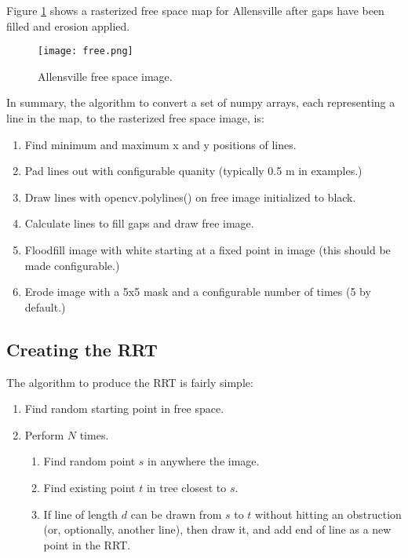 \documentclass[10pt,twocolumn,letterpaper]{article}
\begin{document}
Figure \ref{fig:free} shows a rasterized free space map for Allensville after
gaps have been filled and erosion applied.

\begin{centering}
\begin{figure}[ht]
\caption{Allensville free space image.}
\centering
\texttt{[image: free.png]}
\label{fig:free}
\end{figure}
\end{centering}

In summary, the algorithm to convert a set of numpy arrays, each
representing a line in the map, to the rasterized free space image,
is:

\begin{enumerate}
\item Find minimum and maximum x and y positions of lines.
\item Pad lines out with configurable quanity (typically 0.5 m in examples.)
\item Draw lines with opencv.polylines() on free image initialized to black.
\item Calculate lines to fill gaps and draw free image.
\item Floodfill image with white starting at a fixed point in image (this should be made configurable.)
\item Erode image with a 5x5 mask and a configurable number of times
  (5 by default.)
\end{enumerate}

\subsection{Creating the RRT}

The algorithm to produce the RRT is fairly simple:

\begin{enumerate}
\item Find random starting point in free space.
\item Perform $N$ times.
\begin{enumerate}
\item Find random point $s$ in anywhere the image.
\item Find existing point $t$ in tree closest to $s$.
\item If line of length $d$ can be drawn from $s$ to $t$ without
  hitting an obstruction (or, optionally, another line), then draw it,
  and add end of line as a new point in the RRT.
\end{enumerate}
\end{enumerate}
\end{document}
